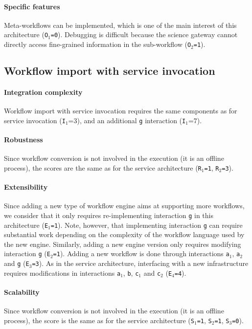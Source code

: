 \documentclass[preprint,3p,twocolumn]{elsarticle}
\begin{document}
\paragraph{Specific features}
Meta-workflows can be implemented, which is one of the main interest of this
architecture (\texttt{O$_1$=0}).  Debugging is difficult because the
science gateway cannot directly access fine-grained information in the
sub-workflow (\texttt{O$_2$=1}).

\subsection{Workflow import with service invocation}

\paragraph{Integration complexity} Workflow import with service invocation
requires the same components as for service invocation
(\texttt{I$_1$}=3), and an additional \texttt{g} interaction (\texttt{I$_1$}=7).

\paragraph{Robustness} Since workflow conversion is not involved in
the execution (it is an offline process), the scores are the same as for the
service architecture (\texttt{R$_1$=1}, \texttt{R$_2$=3}).

\paragraph{Extensibility} Since adding a new type of workflow engine
aims at supporting more workflows, we consider that it only requires
re-implementing interaction \texttt{g} in this architecture  (\texttt{E$_1$=1}). Note,
however, that implementing interaction \texttt{g} can require
substantial work depending on the complexity of the workflow language used by
the new engine. Similarly, adding a
new engine version only requires modifying interaction \texttt{g}
(\texttt{E$_2$=1}).  Adding a new workflow is done through
interactions \texttt{a$_1$}, \texttt{a$_2$} and \texttt{g} (\texttt{E$_3$=3}). As in the
service architecture, interfacing with a new infrastructure requires
modifications in interactions \texttt{a$_1$}, \texttt{b}, \texttt{c$_1$}
and \texttt{c$_2$} (\texttt{E$_4$=4}).

\paragraph{Scalability}  Since workflow conversion is not involved in
the execution (it is an offline process), the score is the same as for the
service architecture (\texttt{S$_1$=1},
\texttt{S$_2$=1}, \texttt{S$_3$=0}).
\end{document}

